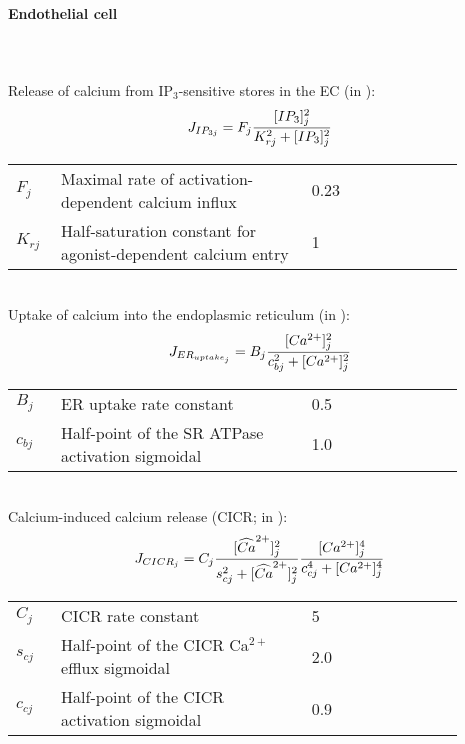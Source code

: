 \paragraph{Endothelial cell}~\\
\\
%
Release of calcium from IP$_{3}$-sensitive stores in the EC (in \uMps):
\begin{equation} \label{eq:JIP3j}
J_{IP_{3j}} = F_{j}\frac{[IP_{3}]_{j}^{2}}{K_{rj}^{2}+[IP_{3}]_{j}^{2}}
\end{equation}
\begin{table}[h!]
\centering
\begin{tabular}{ p{0.09\linewidth}  >{\footnotesize} p{0.5\linewidth}  >{\footnotesize} p{0.27\linewidth} >{\footnotesize} p{0.03\linewidth} }
\hline
 $F_{j}$      			& Maximal rate of activation-dependent calcium influx			& 0.23 \uMps				& \cite{Koenigsberger2006} \\
$K_{rj}$				& Half-saturation constant for agonist-dependent calcium entry	& 1 \uM					& \cite{Koenigsberger2006} \\
\hline
\end{tabular}
\label{tab:IP3j}
\end{table}
\\
%
Uptake of calcium into the endoplasmic reticulum (in \uMs):
\begin{equation} \label{eq:JERuptakej}
J_{ER_{uptake_{j}}} = B_{j}\frac{[Ca^{2+}]_{j}^{2}}{c_{bj}^{2}+[Ca^{2+}]_{j}^{2}}
\end{equation}
%
\begin{table}[h!]
\centering
\begin{tabular}{ p{0.09\linewidth}  >{\footnotesize} p{0.5\linewidth}  >{\footnotesize} p{0.27\linewidth} >{\footnotesize} p{0.03\linewidth} }
\hline
$B_{j}$      			& ER uptake rate constant							& 0.5 \uMs				& \cite{Koenigsberger2006} \\
$c_{bj}$				& Half-point of the SR ATPase activation sigmoidal 	& 1.0 \uM					& \cite{Koenigsberger2006} \\
\hline
\end{tabular}
\label{tab:JERuptakej}
\end{table}
\\
%
Calcium-induced calcium release (CICR; in \uMs):
\begin{equation} \label{eq:JCICRJ}
J_{CICR_{j}} = C_{j}\frac{[\widehat{Ca}^{2+}]_{j}^{2}}{s_{cj}^{2}+[\widehat{Ca}^{2+}]_{j}^{2}}    \frac{[Ca^{2+}]_{j}^{4}}{c_{cj}^{4}+[Ca^{2+}]_{j}^{4}}
\end{equation}
%
\begin{table}[h!]
\centering
\begin{tabular}{ p{0.09\linewidth}  >{\footnotesize} p{0.5\linewidth}  >{\footnotesize} p{0.27\linewidth} >{\footnotesize} p{0.03\linewidth} }
\hline
$C_{j}$      			& CICR rate constant									& 5 \uMs		& \cite{Koenigsberger2006} \\
$s_{cj}$				& Half-point of the CICR Ca$^{2+}$ efflux sigmoidal			& 2.0 \uM		& \cite{Koenigsberger2006} \\
$c_{cj}$				& Half-point of the CICR activation sigmoidal			& 0.9 \uM		& \cite{Koenigsberger2006} \\
\hline
\end{tabular}
\label{tab:JCICRj}
\end{table}
